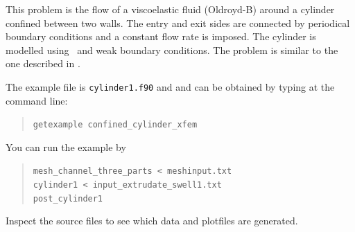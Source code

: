 This problem is the 
flow of a viscoelastic fluid (Oldroyd-B) around a cylinder confined between
two walls.
The entry and exit sides are connected by periodical boundary conditions
and a constant flow rate is imposed.
The cylinder is modelled using \xfem\ and weak boundary conditions.
The problem is similar to the one described in \cite{Choi11}.

The example file is \texttt{cylinder1.f90} and
and can be obtained by typing at the
command line:
\begin{quote}
   \texttt{getexample confined\_cylinder\_xfem}
\end{quote}
You can run the example by
\begin{quote}
   \texttt{mesh\_channel\_three\_parts < meshinput.txt}\\
   \texttt{cylinder1 < input\_extrudate\_swell1.txt}\\
   \texttt{post\_cylinder1}
\end{quote}
Inspect the source files to see which data and plotfiles are generated.
